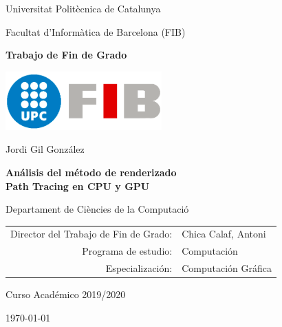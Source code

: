 \newcommand{\HRule}{\rule{\linewidth}{0.5mm}}

\thispagestyle{empty}

\begin{center}

{\large Universitat Politècnica de Catalunya}

\medskip
{\large Facultat d'Informàtica de Barcelona (FIB)}

\vfill
{\bfseries\Large Trabajo de Fin de Grado}

\vfill
\centerline{\mbox{\includegraphics[width=60mm]{media/FIB_UPC.png}}}

\vfill
\vspace{5mm}

{\LARGE Jordi Gil González}

\vspace{15mm}

{\LARGE\bfseries Análisis del método de renderizado \\ Path Tracing en CPU y GPU}

\normalfont \small {}

\vfill

Departament de Ciències de la Computació


\vfill

\begin{tabular}{rl}
Director del Trabajo de Fin de Grado: & Chica Calaf, Antoni \\
\noalign{\vspace{2mm}}
Programa de estudio: & Computación\\
\noalign{\vspace{2mm}}
Especialización: & Computación Gráfica\\
\end{tabular}

\vfill

\large Curso Académico 2019/2020

\large \today

\end{center}
